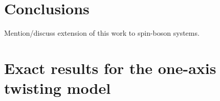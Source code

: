 \documentclass[pra,reprint,longbibliography]{revtex4-1}
\newcommand{\1}{\mathds{1}}
\begin{document}



\section{Conclusions}

Mention/discuss extension of this work to spin-boson systems.


\newpage
\onecolumngrid
\appendix

\section{Exact results for the one-axis twisting model}
\label{sec:OAT}
\end{document}
